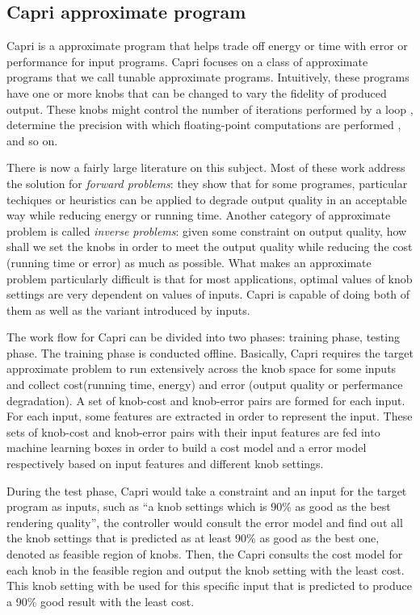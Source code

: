   \subsection{Capri approximate program}
  \label{sec:Capri_intro}
  Capri is a approximate program that helps trade off energy or time with error
  or performance for input programs. Capri focuses on a class of approximate
  programs that we call tunable approximate programs. Intuitively, these
  programs have one or more knobs that can be changed to vary the fidelity of
  produced output. These knobs might control the number of iterations performed
  by a loop \cite{bottou2010large, rinard2007using}, determine the precision with which floating-point
  computations are performed \cite{rubio2013precimonious, schkufza2014stochastic}, and so on.

  There is now a fairly large literature on this subject. Most of these work
  address the solution for \emph{forward problems}: they show that for some
  programes, particular techiques or heuristics can be applied to degrade
  output quality in an acceptable way while reducing energy or running time.
  Another category of approximate problem is called \emph{
  inverse problems}: given some constraint on output quality, how shall we set
  the knobs in order to meet the output quality while reducing the cost (running
  time or error) as much as possible. What makes an approximate problem
  particularly difficult is that for most applications, optimal values of
  knob settings are very dependent on values of inputs. Capri is capable of
  doing both of them as well as the variant introduced by inputs.

  The work flow for Capri can be divided into two phases: training
  phase, testing phase. The training phase is conducted
  offline. Basically, Capri requires the target approximate problem to run
  extensively across the knob space for some inputs and collect cost(running
  time, energy) and error (output quality or perfermance degradation). A set of
  knob-cost and knob-error pairs are formed for each input. For each input, some
  features are extracted in order to represent the input. These sets of
  knob-cost and knob-error pairs with their input features are fed into
  machine learning boxes in order to build a cost model and a error model
  respectively based on input features and different knob settings.

  During the test phase, Capri would take a
  constraint and an input for the target program as inputs, such as ``a knob
  settings which is 90\% as good as the best rendering quality'', the
  controller would consult the error model and find out
  all the knob settings that is predicted as at least 90\% as good as the best
  one, denoted as feasible region of knobs. Then, the Capri consults the
  cost model for each knob in the feasible region and output the knob setting
  with the least cost. This knob setting with be used for this specific input
  that is predicted to produce a 90\% good result with the least cost.

